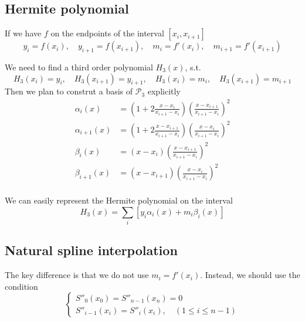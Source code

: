 \documentclass[conference]{IEEEtran}
\begin{document}
\subsection{Hermite polynomial}
\par If we have $f$ on the endpoints of the interval $[x_i,x_{i+1}]$
\begin{equation}
    y_i = f(x_i),\quad y_{i+1}=f(x_{i+1}),\quad m_i = f'(x_i),\quad m_{i+1} = f'(x_{i+1})
\end{equation}
\par We need to find a third order polynomial $H_3(x)$, s.t.
\begin{equation}
    H_3(x_i) = y_i,\quad H_3(x_{i+1}) = y_{i+1},\quad H_3(x_i) = m_i,\quad H_3(x_{i+1}) = m_{i+1}
\end{equation}
Then we plan to construt a basis of $\mathcal{P}_3$ explicitly
\begin{equation}
    \begin{split}
        \alpha_i(x) &= (1+2\frac{x-x_i}{x_{i+1}-x_i})(\frac{x-x_{i+1}}{x_{i+1}-x_i})^2\\
        \alpha_{i+1} (x) &= (1+2\frac{x-x_{i+1}}{x_{i+1}-x_i})(\frac{x-x_{i}}{x_{i+1}-x_i})^2\\
        \beta_i(x) &= (x-x_i)(\frac{x-x_{i+1}}{x_{i+1}-x_i})^2\\
        \beta_{i+1}(x) &= (x-x_{i+1})(\frac{x-x_{i}}{x_{i+1}-x_i})^2\\
    \end{split}
\end{equation}
\par We can easily represent the Hermite polynomial on the interval
\begin{equation}
    H_3(x) = \sum_i [y_i \alpha_i(x)+m_i \beta_i(x)]
\end{equation}

\subsection{Natural spline interpolation}
The key difference is that we do not use $m_i=f'(x_i)$. Instead, we should use the condition 
\begin{equation}
    \begin{cases}
        S''_0(x_0) = S''_{n-1}(x_n) = 0\\
        S''_{i-1}(x_i) = S''_i(x_i),\quad (1\leq i \leq n-1)
    \end{cases}
\end{equation}
\end{document}
